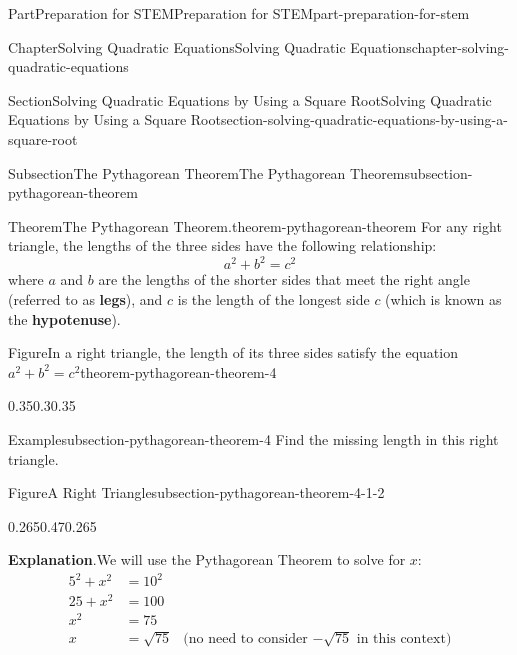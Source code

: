 \documentclass[twoside,10pt,]{book}
\newcommand{\blocktitlefont}{\relax}
\newcommand{\terminology}[1]{\textbf{#1}}
\numberwithin{equation}{section}
\newcommand{\amp}{&}
\begin{document}
\begin{partptx}{Part}{Preparation for STEM}{}{Preparation for STEM}{}{}{part-preparation-for-stem}
\begin{chapterptx}{Chapter}{Solving Quadratic Equations}{}{Solving Quadratic Equations}{}{}{chapter-solving-quadratic-equations}
\begin{sectionptx}{Section}{Solving Quadratic Equations by Using a Square Root}{}{Solving Quadratic Equations by Using a Square Root}{}{}{section-solving-quadratic-equations-by-using-a-square-root}
\begin{subsectionptx}{Subsection}{The Pythagorean Theorem}{}{The Pythagorean Theorem}{}{}{subsection-pythagorean-theorem}
\begin{theorem}{Theorem}{The Pythagorean Theorem.}{}{theorem-pythagorean-theorem}
For any right triangle, the lengths of the three sides have the following relationship:%
\begin{equation*}
a^2+b^2=c^2
\end{equation*}
where \(a\) and \(b\) are the lengths of the shorter sides that meet the right angle (referred to as \terminology{legs}), and \(c\) is the length of the longest side \(c\) (which is known as the \terminology{hypotenuse}).%
\begin{figureptx}{Figure}{In a right triangle, the length of its three sides satisfy the equation \(a^2+b^2=c^2\)}{theorem-pythagorean-theorem-4}{}%
\begin{image}{0.35}{0.3}{0.35}{}%
%
\end{image}%
\tcblower
\end{figureptx}%
\end{theorem}
\begin{example}{Example}{}{subsection-pythagorean-theorem-4}%
Find the missing length in this right triangle.%
\begin{figureptx}{Figure}{A Right Triangle}{subsection-pythagorean-theorem-4-1-2}{}%
\begin{image}{0.265}{0.47}{0.265}{}%
%
\end{image}%
\tcblower
\end{figureptx}%
\par\smallskip%
{\makeatletter{}\makeatother\noindent\textbf{\blocktitlefont Explanation}.\hypertarget{subsection-pythagorean-theorem-4-2}{}\quad{}We will use the Pythagorean Theorem to solve for \(x\):%
\begin{align*}
5^2+x^2\amp=10^2\\
25+x^2\amp=100\\
x^2\amp=75\\
x\amp=\sqrt{75}\amp\text{(no need to consider }{-\sqrt{75}}\text{ in this context)}\\

\end{align*}}
\end{example}
\end{subsectionptx}
\end{sectionptx}
\end{chapterptx}
\end{partptx}
\end{document}
